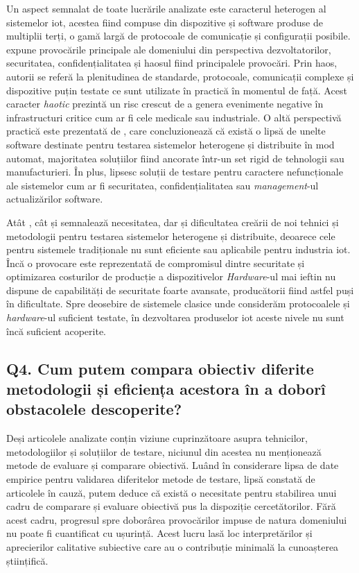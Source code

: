 Un aspect semnalat de toate lucrările analizate este caracterul heterogen al sistemelor \acrshort{iot}, acestea fiind compuse din dispozitive și software produse de multiplii terți, o gamă largă de protocoale de comunicație și configurații posibile. \cite{Lee2015} expune provocările principale ale domeniului din perspectiva dezvoltatorilor, securitatea, confidențialitatea și haosul fiind principalele provocări. Prin haos, autorii se referă la plenitudinea de standarde, protocoale, comunicații complexe și dispozitive puțin testate ce sunt utilizate în practică în momentul de față. Acest caracter \textit{haotic} prezintă un risc crescut de a genera evenimente negative în infrastructuri critice cum ar fi cele medicale sau industriale. O altă perspectivă practică este prezentată de \cite{Dias2018}, care concluzionează că există o lipsă de unelte software destinate pentru testarea sistemelor heterogene și distribuite în mod automat, majoritatea soluțiilor fiind ancorate într-un set rigid de tehnologii sau manufacturieri. În plus, lipsesc soluții de testare pentru caractere nefuncționale ale sistemelor cum ar fi securitatea, confidențialitatea sau \textit{management}-ul actualizărilor software.

Atât \cite{Corts2019}, cât și \cite{Ahmed2019} semnalează necesitatea, dar și dificultatea creării de noi tehnici și metodologii pentru testarea sistemelor heterogene și distribuite, deoarece cele pentru sistemele tradiționale nu sunt eficiente sau aplicabile pentru industria \acrshort{iot}. Încă o provocare este reprezentată de compromisul dintre securitate și optimizarea costurilor de producție a dispozitivelor \textit{Hardware}-ul mai ieftin nu dispune de capabilități de securitate foarte avansate, producătorii fiind astfel puși în dificultate. Spre deosebire de sistemele clasice unde considerăm protocoalele și \textit{hardware}-ul suficient testate, în dezvoltarea produselor \acrshort{iot} aceste nivele nu sunt încă suficient acoperite.

\subsection*{Q4. Cum putem compara obiectiv diferite metodologii și eficiența acestora în a doborî obstacolele descoperite?}

Deși articolele analizate conțin viziune cuprinzătoare asupra tehnicilor, metodologiilor și soluțiilor de testare, niciunul din acestea nu menționează metode de evaluare și comparare obiectivă. Luând în considerare lipsa de date empirice pentru validarea diferitelor metode de testare, lipsă constată de articolele în cauză, putem deduce că există o necesitate pentru stabilirea unui cadru de comparare și evaluare obiectivă pus la dispoziție cercetătorilor. Fără acest cadru, progresul spre doborârea provocărilor impuse de natura domeniului nu poate fi cuantificat cu ușurință. Acest lucru lasă loc interpretărilor și aprecierilor calitative subiective care au o contribuție minimală la cunoașterea științifică.

